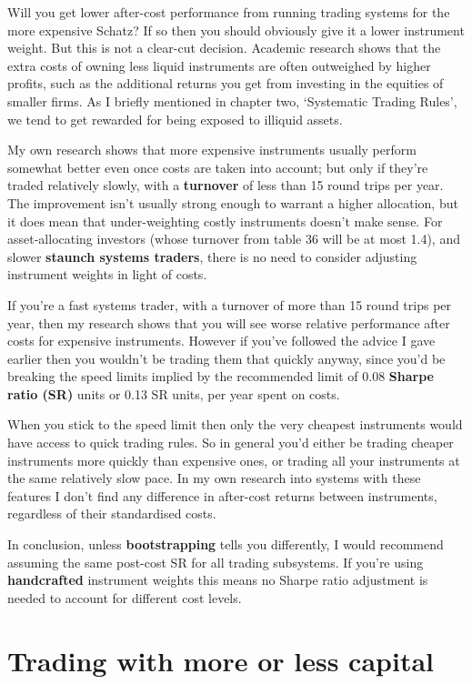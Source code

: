 Will you get lower after-cost performance from running trading systems for the more expensive Schatz? If so then you should obviously give it a lower instrument weight. But this is not a clear-cut decision. Academic research shows that the extra costs of owning less liquid instruments are often outweighed by higher profits, such as the additional returns you get from investing in the equities of smaller firms. As I briefly mentioned in chapter two, ‘Systematic Trading Rules', we tend to get rewarded for being exposed to illiquid assets.

My own research shows that more expensive instruments usually perform somewhat better even once costs are taken into account; but only if they're traded relatively slowly, with a \textbf{turnover} of less than 15 round trips per year. The improvement isn't usually strong enough to warrant a higher allocation, but it does mean that under-weighting costly instruments doesn't make sense. For asset-allocating investors (whose turnover from table 36 will be at most 1.4), and slower \textbf{staunch systems traders}, there is no need to consider adjusting instrument weights in light of costs.

If you're a fast systems trader, with a turnover of more than 15 round trips per year, then my research shows that you will see worse relative performance after costs for expensive instruments. However if you've followed the advice I gave earlier then you wouldn't be trading them that quickly anyway, since you'd be breaking the speed limits implied by the recommended limit of 0.08 \textbf{Sharpe ratio (SR)} units or 0.13 SR units, per year spent on costs.

When you stick to the speed limit then only the very cheapest instruments would have access to quick trading rules. So in general you'd either be trading cheaper instruments more quickly than expensive ones, or trading all your instruments at the same relatively slow pace. In my own research into systems with these features I don't find any difference in after-cost returns between instruments, regardless of their standardised costs.

In conclusion, unless \textbf{bootstrapping} tells you differently, I would recommend assuming the same post-cost SR for all trading subsystems. If you're using \textbf{handcrafted} instrument weights this means no Sharpe ratio adjustment is needed to account for different cost levels.

\section*{Trading with more or less capital}  {}

